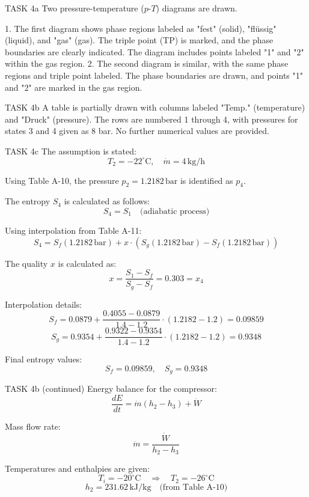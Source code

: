 TASK 4a  
Two pressure-temperature (\(p\)-\(T\)) diagrams are drawn.  

1. The first diagram shows phase regions labeled as "fest" (solid), "flüssig" (liquid), and "gas" (gas). The triple point (TP) is marked, and the phase boundaries are clearly indicated. The diagram includes points labeled "1" and "2" within the gas region.  
2. The second diagram is similar, with the same phase regions and triple point labeled. The phase boundaries are drawn, and points "1" and "2" are marked in the gas region.  

TASK 4b  
A table is partially drawn with columns labeled "Temp." (temperature) and "Druck" (pressure). The rows are numbered 1 through 4, with pressures for states 3 and 4 given as 8 bar. No further numerical values are provided.  

TASK 4c  
The assumption is stated:  
\[
T_2 = -22^\circ\text{C}, \quad \dot{m} = 4 \, \text{kg/h}
\]  

Using Table A-10, the pressure \(p_2 = 1.2182 \, \text{bar}\) is identified as \(p_4\).  

The entropy \(S_4\) is calculated as follows:  
\[
S_4 = S_1 \quad \text{(adiabatic process)}
\]  

Using interpolation from Table A-11:  
\[
S_4 = S_f(1.2182 \, \text{bar}) + x \cdot \left(S_g(1.2182 \, \text{bar}) - S_f(1.2182 \, \text{bar})\right)
\]  

The quality \(x\) is calculated as:  
\[
x = \frac{S_1 - S_f}{S_g - S_f} = 0.303 = x_4
\]  

Interpolation details:  
\[
S_f = 0.0879 + \frac{0.4055 - 0.0879}{1.4 - 1.2} \cdot (1.2182 - 1.2) = 0.09859
\]  
\[
S_g = 0.9354 + \frac{0.9322 - 0.9354}{1.4 - 1.2} \cdot (1.2182 - 1.2) = 0.9348
\]  

Final entropy values:  
\[
S_f = 0.09859, \quad S_g = 0.9348
\]  

TASK 4b (continued)  
Energy balance for the compressor:  
\[
\frac{dE}{dt} = \dot{m}(h_2 - h_3) + \dot{W}
\]  

Mass flow rate:  
\[
\dot{m} = \frac{\dot{W}}{h_2 - h_3}
\]  

Temperatures and enthalpies are given:  
\[
T_i = -20^\circ\text{C} \quad \Rightarrow \quad T_2 = -26^\circ\text{C}
\]  
\[
h_2 = 231.62 \, \text{kJ/kg} \quad \text{(from Table A-10)}
\]  